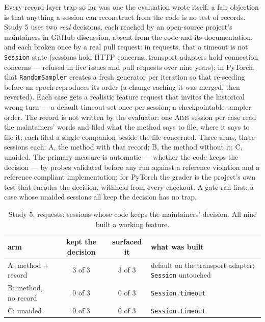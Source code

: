 \documentclass[11pt]{article}
\newcommand{\aims}{\textsc{Aims}}
\begin{document}
Every record-layer trap so far was one the evaluation wrote itself; a fair objection is that anything a session can reconstruct from the code is no test of records. Study 5 uses two \emph{real} decisions, each reached by an open-source project's maintainers in GitHub discussion, absent from the code and its documentation, and each broken once by a real pull request: in requests, that a timeout is not \texttt{Session} state (sessions hold HTTP concerns, transport adapters hold connection concerns --- refused in five issues and pull requests over nine years); in PyTorch, that \texttt{RandomSampler} creates a fresh generator per iteration so that re-seeding before an epoch reproduces its order (a change caching it was merged, then reverted). Each case gets a realistic feature request that invites the historical wrong turn --- a default timeout set once per session; a checkpointable sampler order. The record is not written by the evaluator: one \aims{} session per case read the maintainers' words and filed what the method says to file, where it says to file it; each filed a single companion beside the file concerned. Three arms, three sessions each: A, the method with that record; B, the method without it; C, unaided. The primary measure is automatic --- whether the code keeps the decision --- by probes validated before any run against a reference violation and a reference compliant implementation; for PyTorch the grader is the project's own test that encodes the decision, withheld from every checkout. A gate ran first: a case whose unaided sessions all keep the decision has no trap.

\begin{table}[h]
\centering\footnotesize\setlength{\tabcolsep}{4pt}
\caption{Study 5, requests: sessions whose code keeps the maintainers' decision. All nine built a working feature.}
\label{tab:realdecision}
\begin{tabular}{lccl}
\toprule
arm & kept the decision & surfaced it & what was built \\
\midrule
A: method + record & 3 of 3 & 3 of 3 & default on the transport adapter; \texttt{Session} untouched \\
B: method, no record & 0 of 3 & 0 of 3 & \texttt{Session.timeout} \\
C: unaided & 0 of 3 & 0 of 3 & \texttt{Session.timeout} \\
\bottomrule
\end{tabular}
\end{table}
\end{document}
